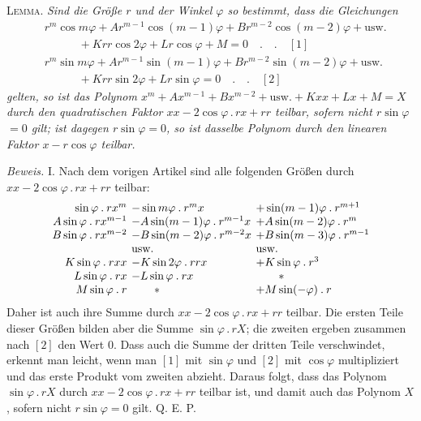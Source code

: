 \textsc{Lemma.} \textit{Sind die Größe $r$ und der Winkel $\varphi$ so bestimmt, dass die Gleichungen}
\[
\begin{aligned}
&r^m\cos m\varphi+Ar^{m-1}\cos(m-1)\varphi+Br^{m-2}\cos(m-2)\varphi+\text{usw.}\\
&\hspace{3em}+Krr\cos2\varphi+Lr\cos\varphi+M=0\quad.\quad.\quad[1]\\
&r^m\sin m\varphi+Ar^{m-1}\sin(m-1)\varphi+Br^{m-2}\sin(m-2)\varphi+\text{usw.}\\
&\hspace{3em}+Krr\sin2\varphi+Lr\sin\varphi=0\quad.\quad.\quad[2]
\end{aligned}
\]
\textit{gelten, so ist das Polynom $x^m+Ax^{m-1}+Bx^{m-2}+\text{usw.}+Kxx+Lx+M=X$ durch den quadratischen Faktor $xx-2\cos\varphi\mathbin{.}rx+rr$ teilbar, sofern nicht $r\sin\varphi$ $=0$ gilt; ist dagegen $r\sin\varphi=0$, so ist dasselbe Polynom durch den linearen Faktor $x-r\cos\varphi$ teilbar.}

\textit{Beweis.} I. Nach dem vorigen Artikel sind alle folgenden Größen durch $xx-2\cos\varphi\mathbin{.}rx+rr$ teilbar:
{\small
\[
\setlength{\arraycolsep}{2pt}
\begin{array}{rll}
\sin\varphi\mathbin{.}rx^m&-\sin m\varphi\mathbin{.}r^m x&+\sin(m-1)\varphi\mathbin{.}r^{m+1}\\
A\sin\varphi\mathbin{.}rx^{m-1}&-A\sin(m-1)\varphi\mathbin{.}r^{m-1}x&+A\sin(m-2)\varphi\mathbin{.}r^m\\
B\sin\varphi\mathbin{.}rx^{m-2}&-B\sin(m-2)\varphi\mathbin{.}r^{m-2}x&+B\sin(m-3)\varphi\mathbin{.}r^{m-1}\\
&\text{usw.}&\text{usw.}\\
K\sin\varphi\mathbin{.}rxx&-K\sin2\varphi\mathbin{.}rrx&+K\sin\varphi\mathbin{.}r^3\\
L\sin\varphi\mathbin{.}rx&-L\sin\varphi\mathbin{.}rx&\qquad *\\
M\sin\varphi\mathbin{.}r&\qquad *&+M\sin(-\varphi)\mathbin{.}r
\end{array}
\]
}
Daher ist auch ihre Summe durch $xx-2\cos\varphi\mathbin{.}rx+rr$ teilbar. Die ersten Teile dieser Größen bilden aber die Summe $\sin\varphi\mathbin{.}rX$; die zweiten ergeben zusammen nach $[2]$ den Wert $0$. Dass auch die Summe der dritten Teile verschwindet, erkennt man leicht, wenn man $[1]$ mit $\sin\varphi$ und $[2]$ mit $\cos\varphi$ multipliziert und das erste Produkt vom zweiten abzieht. Daraus folgt, dass das Polynom $\sin\varphi\mathbin{.}rX$ durch $xx-2\cos\varphi\mathbin{.}rx+rr$ teilbar ist, und damit auch das Polynom $X$, sofern nicht $r\sin\varphi=0$ gilt. Q. E. P.

